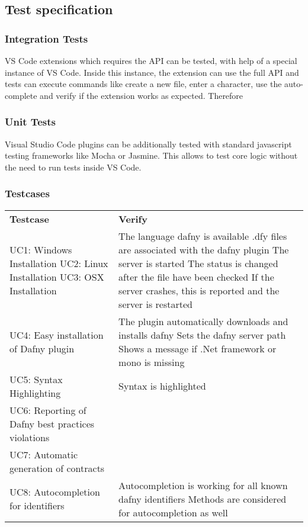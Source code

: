\subsection{Test specification}

\subsubsection{Integration Tests}
VS Code extensions which requires the API can be tested, with help of a special instance of VS Code. Inside this instance, the extension can use the full API and tests can execute commands like create a new file, enter a character, use the auto-complete and verify if the extension works as expected. Therefore  


\subsubsection{Unit Tests}
	Visual Studio Code plugins can be additionally tested with standard javascript testing frameworks like Mocha or Jasmine. This allows to test core logic without the need to run tests inside VS Code. 

\subsubsection{Testcases}

\begin{longtable}{ p{} | p{} }
	\textbf{Testcase} & \textbf{Verify}\\
	UC1: Windows Installation\newline 
	UC2: Linux Installation\newline 
	UC3: OSX Installation & 
		The language dafny is available\newline 
		.dfy files are associated with the dafny plugin\newline
		The server is started\newline
		The status is changed after the file have been checked\newline
		If the server crashes, this is reported and the server is restarted
	\\
	UC4: Easy installation of Dafny plugin & 
		The plugin automatically downloads and installs dafny\newline
		Sets the dafny server path \newline
		Shows a message if .Net framework or mono is missing
	\\
	UC5: Syntax Highlighting & 
		Syntax is highlighted
	\\
	UC6: Reporting of Dafny best practices violations &
		\todo{?}
	
 	\\
	UC7: Automatic generation of contracts & \todo{Invariant: Require and ensures are generated?} \\
	UC8: Autocompletion for identifiers & 
		Autocompletion is working for all known dafny identifiers\newline
		Methods are considered for autocompletion as well
		
	
	\\
\end{longtable}
